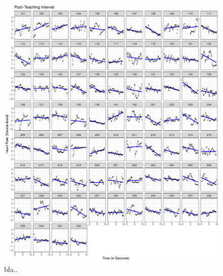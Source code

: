 \documentclass[preprint, 3p,
authoryear]{elsarticle} %
\begin{document}
\begin{figure}[htbp]
  \centering
  \includegraphics[width=1\textwidth]{plots_publication/plot_post_teaching_appendix.pdf}
  \caption{bla..}
  \label{post_teaching}
\end{figure}
\end{document}
